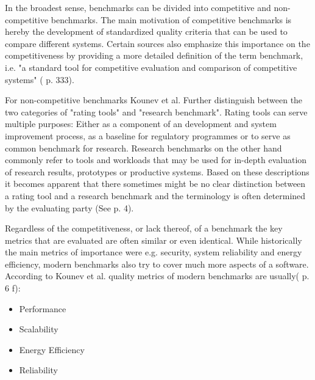 \documentclass[	runningheads,
				a4paper]{llncs}
\begin{document}
In the broadest sense, benchmarks can be divided into competitive and non-competitive benchmarks. The main motivation of competitive benchmarks is hereby the development of standardized quality criteria that can be used to compare different systems. Certain sources also emphasize this importance on the competitiveness by providing a more detailed definition of the term benchmark, i.e. "a standard tool for competitive evaluation and comparison of competitive systems" (\cite{kistowski2015} p. 333).

For non-competitive benchmarks Kounev et al. Further distinguish between the two categories of "rating tools" and "research benchmark". Rating tools can serve multiple purposes: Either as a component of an development and system improvement process, as a baseline for regulatory programmes or to serve as common benchmark for research. Research benchmarks on the other hand commonly refer to tools and workloads that may be used for in-depth evaluation of research results, prototypes or productive systems. Based on these descriptions it becomes apparent that there sometimes might be no clear distinction between a rating tool and a research benchmark and the terminology is often determined by the evaluating party (See \cite{Kounev} p. 4).

Regardless of the competitiveness, or lack thereof, of a benchmark the key metrics that are evaluated are often similar or even identical. While historically the main metrics of importance were e.g. security, system reliability and energy efficiency, modern benchmarks also try to cover much more aspects of a software. According to Kounev et al. quality metrics of modern benchmarks are usually(\cite{Kounev} p. 6 f):
\begin{itemize}
	\item Performance
	\item Scalability
	\item	Energy Efficiency
	\item Reliability
\end{itemize}

\end{document}
